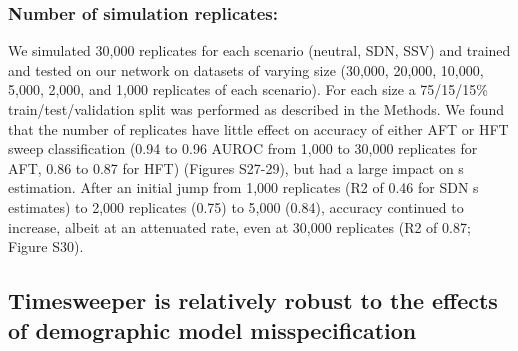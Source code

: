 \subsubsection{Number of simulation replicates:} We simulated 30,000 replicates for each scenario (neutral, SDN, SSV) and trained and tested on our network on datasets of varying size (30,000, 20,000, 10,000, 5,000, 2,000, and 1,000 replicates of each scenario). For each size a 75/15/15\% train/test/validation split was performed as described in the Methods. We found that the number of replicates have little effect on accuracy of either AFT or HFT sweep classification (0.94 to 0.96 AUROC from 1,000 to 30,000 replicates for AFT, 0.86 to 0.87 for HFT) (Figures S27-29), but had a large impact on s estimation. After an initial jump from 1,000 replicates (R2 of 0.46 for SDN s estimates) to 2,000 replicates (0.75) to 5,000 (0.84), accuracy continued to increase, albeit at an attenuated rate, even at 30,000 replicates (R2 of 0.87; Figure S30). \\

\subsection{Timesweeper is relatively robust to the effects of demographic model misspecification}

